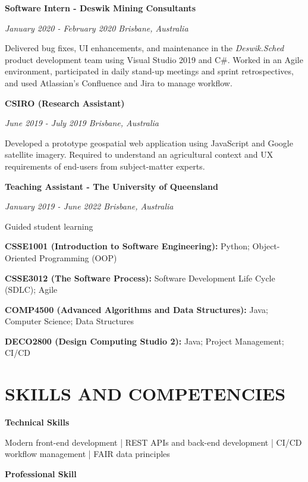 \documentclass{article}
\begin{document}
  \medbreak

  {\large\textbf{Software Intern - Deswik Mining Consultants}}

  \textit{January 2020 - February 2020 \hfill Brisbane, Australia}

  Delivered bug fixes, UI enhancements, and maintenance in the \textit{Deswik.Sched} product development team using Visual Studio 2019 and C\#. Worked in an Agile environment, participated in daily stand-up meetings and sprint retrospectives, and used Atlassian's Confluence and Jira to manage workflow.

  \medbreak

  {\large\textbf{CSIRO (Research Assistant)}}

  \textit{June 2019 - July 2019 \hfill Brisbane, Australia}

  Developed a prototype geospatial web application using JavaScript and Google satellite imagery. Required to understand an agricultural context and UX requirements of end-users from subject-matter experts.

  \pagebreak

  {\large\textbf{Teaching Assistant - The University of Queensland}}

  \textit{January 2019 - June 2022 \hfill Brisbane, Australia}

  Guided student learning

  \textbf{CSSE1001 (Introduction to Software Engineering):} Python; Object-Oriented Programming (OOP)

  \textbf{CSSE3012 (The Software Process):} Software Development Life Cycle (SDLC); Agile

  \textbf{COMP4500 (Advanced Algorithms and Data Structures):} Java; Computer Science; Data Structures

  \textbf{DECO2800 (Design Computing Studio 2):} Java; Project Management; CI/CD

  \section*{\centering\uppercase{Skills and Competencies}}

  {\large\textbf{Technical Skills}}

  Modern front-end development | REST APIs and back-end development | CI/CD workflow management | FAIR data principles

  \medbreak

  {\large\textbf{Professional Skill}}
\end{document}
